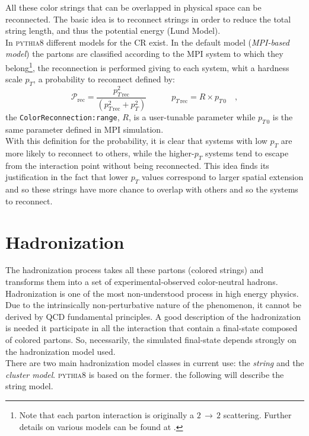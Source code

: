 \noindent All these color strings that can be overlapped in physical space can be reconnected.  
The basic idea is to reconnect strings in order to reduce the total string length, and thus the potential energy (Lund Model).
\\
In \textsc{pythia8} different models for the CR exist. In the default model (\textit{MPI-based model}) the partons are classified according to the MPI system to which they belong\footnote{Note that each parton interaction is originally a $2\,\rightarrow\,2$ scattering. Further details on various models can be found at  \cite{CRrecon}.}, the  reconnection is performed giving to each system, whit a hardness scale $p_T$, a probability to reconnect defined by:
\begin{equation}
	\mathcal{P}_{\text{rec}}=\frac{p_{T\,\text{rec}}^2}{\left(p_{T\,\text{rec}}^2 + p_T^2\right)} \qquad\quad p_{T\,\text{rec}}=R\times p_{T\,0}\quad,
\end{equation} 
the \texttt{ColorReconnection:range}, $R$, is a user-tunable parameter while $p_{T\,0}$ is the same parameter defined in MPI simulation.
\\
With this definition for the probability, it is clear that systems with low $p_T$ are more likely to reconnect to others, while the higher-$p_T$ systems tend to escape from the interaction point without being reconnected. This idea finds its justification in the fact that lower $p_T$ values correspond to larger spatial extension and so these strings have more chance to overlap with others and so the systems to reconnect.

\section{Hadronization}


The hadronization process takes all these partons (colored strings) and transforms them into a set of experimental-observed color-neutral hadrons. 
\\
Hadronization is one of the most non-understood process in high energy physics. Due to the intrinsically non-perturbative nature of the phenomenon, it cannot be derived by QCD fundamental principles. A good description of the hadronization is needed it participate in all the interaction that contain a final-state composed of colored partons. So, necessarily, the simulated final-state depends strongly on the hadronization model used.  
\\
There are two main hadronization model classes in current use: the \textit{string} and the \textit{cluster model}. \textsc{pythia8} is based on the former. the following will describe the string model.

